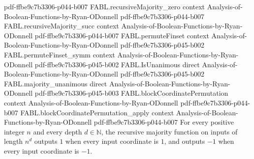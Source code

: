 \begin{theorem}
  {pdf-ffbe9c7b3306-p044-b007}
\proofstep
  {FABL.recursiveMajority_zero}
  {context}
  {Analysis-of-Boolean-Functions-by-Ryan-ODonnell}
  {pdf-ffbe9c7b3306-p044-b007}
\proofstep
  {FABL.recursiveMajority_succ}
  {context}
  {Analysis-of-Boolean-Functions-by-Ryan-ODonnell}
  {pdf-ffbe9c7b3306-p044-b007}
\proofstep
  {FABL.permuteFinset}
  {context}
  {Analysis-of-Boolean-Functions-by-Ryan-ODonnell}
  {pdf-ffbe9c7b3306-p045-b002}
\proofstep
  {FABL.permuteFinset_symm}
  {context}
  {Analysis-of-Boolean-Functions-by-Ryan-ODonnell}
  {pdf-ffbe9c7b3306-p045-b002}
\proofstep
  {FABL.IsUnanimous}
  {direct}
  {Analysis-of-Boolean-Functions-by-Ryan-ODonnell}
  {pdf-ffbe9c7b3306-p045-b002}
\proofstep
  {FABL.majority_unanimous}
  {direct}
  {Analysis-of-Boolean-Functions-by-Ryan-ODonnell}
  {pdf-ffbe9c7b3306-p045-b003}
\proofstep
  {FABL.blockCoordinatePermutation}
  {context}
  {Analysis-of-Boolean-Functions-by-Ryan-ODonnell}
  {pdf-ffbe9c7b3306-p044-b007}
\proofstep
  {FABL.blockCoordinatePermutation_apply}
  {context}
  {Analysis-of-Boolean-Functions-by-Ryan-ODonnell}
  {pdf-ffbe9c7b3306-p044-b007}
For every positive integer $n$ and every depth $d \in \mathbb{N}$, the recursive
majority function on inputs of length $n^d$ outputs $1$ when every input coordinate is
$1$, and outputs $-1$ when every input coordinate is $-1$.
\end{theorem}

